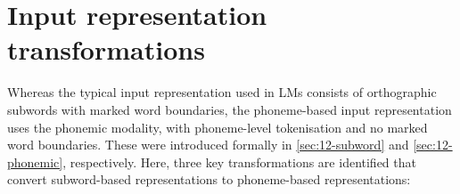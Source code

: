



\section{Input representation transformations}

Whereas the typical input representation used in LMs consists of orthographic subwords with marked word boundaries, the phoneme-based input representation uses the phonemic modality, with phoneme-level tokenisation and no marked word boundaries. These were introduced formally in \cref{sec:12-subword} and \cref{sec:12-phonemic}, respectively. Here, three key transformations are identified that convert subword-based representations to phoneme-based representations:

